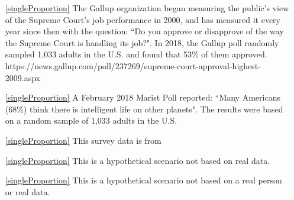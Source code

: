 
\begin{itemize}

\item[\ref{singleProportion}]
    The Gallup organization began measuring the public's view of the Supreme Court's job performance in 2000, and has measured it every year since then with the question: ``Do you approve or disapprove of the way the Supreme Court is handling its job?".  In 2018, the Gallup poll randomly sampled 1,033 adults in the U.S. and found that 53\% of them approved. \\   
        {https://news.gallup.com/poll/237269/supreme-court-approval-highest-2009.aspx}

\item[\ref{singleProportion}]
    A February 2018 Marist Poll reported: ``Many Americans (68\%) think there is intelligent life on other planets".  The results were based on a random sample of 1,033 adults in the U.S. \\

\item[\ref{singleProportion}]
    This survey data is from\\

\item[\ref{singleProportion}]
    This is a hypothetical scenario not based on real data.

\item[\ref{singleProportion}]
    This is a hypothetical scenario not based on a real person
    or real data.



\end{itemize}
